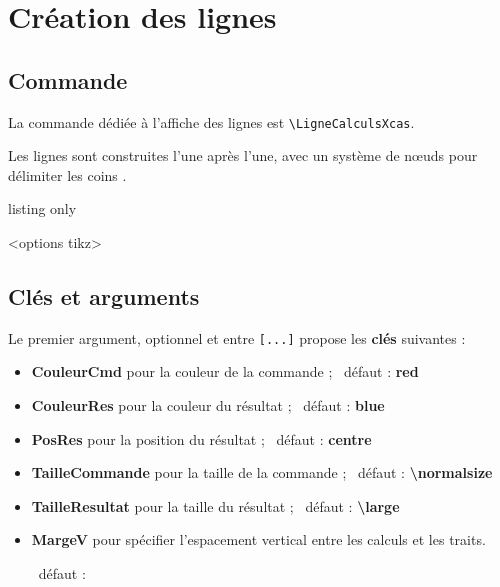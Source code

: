 \documentclass[french,a4paper,11pt]{article}
\newcommand\Cle[1]{{\bfseries\sffamily\textlangle #1\textrangle}}
\begin{document}
\pagebreak

\section{Création des lignes}

\subsection{Commande}

\begin{cautionblock}
La commande dédiée à l'affiche des lignes est \texttt{\textbackslash LigneCalculsXcas}.

Les lignes sont construites l'une après l'une, avec un système de nœuds pour délimiter les \og coins \fg.
\end{cautionblock}

\begin{PresentationCode}{listing only}
\begin{CalculFormelXcas}<options tikz>
\end{CalculFormelXcas}
\end{PresentationCode}

\begin{PresentationCode}{}
\begin{CalculFormelXcas}
\end{CalculFormelXcas}
\end{PresentationCode}

\subsection{Clés et arguments}

\begin{tipblock}
Le premier argument, optionnel et entre \texttt{[...]} propose les \Cle{clés} suivantes :

\begin{itemize}
	\item \Cle{CouleurCmd} pour la couleur de la commande ; \hfill~défaut : \Cle{red}
	\item \Cle{CouleurRes} pour la couleur du résultat ; \hfill~défaut : \Cle{blue}
	\item \Cle{PosRes} pour la position du résultat ; \hfill~défaut : \Cle{centre}
	\item \Cle{TailleCommande} pour la taille de la commande ; \hfill~défaut : \Cle{\textbackslash normalsize}
	\item \Cle{TailleResultat} pour la taille du résultat ; \hfill~défaut : \Cle{\textbackslash large}
	\item \Cle{MargeV} pour spécifier l'espacement vertical entre les calculs et les traits.
	
	\hfill~défaut : \Cle{6pt}
\end{itemize}
\vspace*{-\baselineskip}\leavevmode
\end{tipblock}
\end{document}
